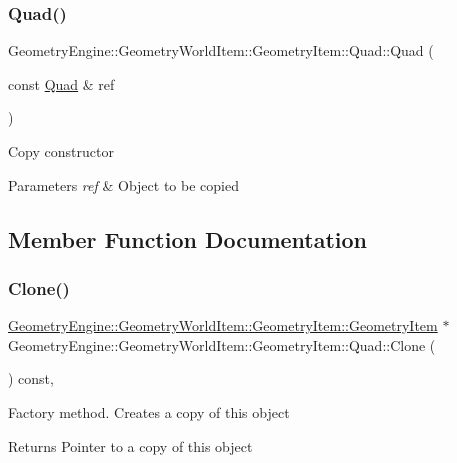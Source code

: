 \subsubsection{\texorpdfstring{Quad()}{Quad()}\hspace{0.1cm}{\footnotesize\ttfamily [2/2]}}
{\footnotesize\ttfamily Geometry\+Engine\+::\+Geometry\+World\+Item\+::\+Geometry\+Item\+::\+Quad\+::\+Quad (\begin{DoxyParamCaption}\item[{const \mbox{\hyperlink{class_geometry_engine_1_1_geometry_world_item_1_1_geometry_item_1_1_quad}{Quad}} \&}]{ref }\end{DoxyParamCaption})}

Copy constructor 
\begin{DoxyParams}{Parameters}
{\em ref} & Object to be copied \\
\hline
\end{DoxyParams}


\subsection{Member Function Documentation}
\mbox{\label{class_geometry_engine_1_1_geometry_world_item_1_1_geometry_item_1_1_quad_ad3a6d04a38253d1f26735a87a53a5446}} 
\subsubsection{\texorpdfstring{Clone()}{Clone()}}
{\footnotesize\ttfamily \mbox{\hyperlink{class_geometry_engine_1_1_geometry_world_item_1_1_geometry_item_1_1_geometry_item}{Geometry\+Engine\+::\+Geometry\+World\+Item\+::\+Geometry\+Item\+::\+Geometry\+Item}} $\ast$ Geometry\+Engine\+::\+Geometry\+World\+Item\+::\+Geometry\+Item\+::\+Quad\+::\+Clone (\begin{DoxyParamCaption}{ }\end{DoxyParamCaption}) const\hspace{0.3cm}{\ttfamily [override]}, {\ttfamily [virtual]}}

Factory method. Creates a copy of this object \begin{DoxyReturn}{Returns}
Pointer to a copy of this object 
\end{DoxyReturn}


